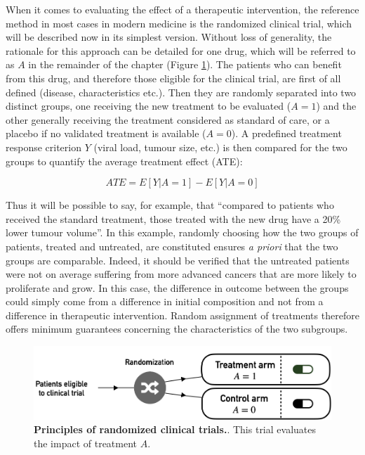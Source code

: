 \documentclass[a4paper,12pt,twoside,onecolumn,openright,final,oldfontcommands]{memoir}
\begin{document}
When it comes to evaluating the effect of a therapeutic intervention,
the reference method in most cases in modern medicine is the randomized
clinical trial, which will be described now in its simplest version.
Without loss of generality, the rationale for this approach can be
detailed for one drug, which will be referred to as \(A\) in the
remainder of the chapter (Figure \ref{fig:trials}). The patients who can
benefit from this drug, and therefore those eligible for the clinical
trial, are first of all defined (disease, characteristics etc.). Then
they are randomly separated into two distinct groups, one receiving the
new treatment to be evaluated (\(A=1\)) and the other generally
receiving the treatment considered as standard of care, or a placebo if
no validated treatment is available (\(A=0\)). A predefined treatment
response criterion \(Y\) (viral load, tumour size, etc.) is then
compared for the two groups to quantify the average treatment effect
(ATE):

\[ATE= E[Y|A=1]-E[Y|A=0]\]

Thus it will be possible to say, for example, that ``compared to
patients who received the standard treatment, those treated with the new
drug have a 20\% lower tumour volume''. In this example, randomly
choosing how the two groups of patients, treated and untreated, are
constituted ensures \emph{a priori} that the two groups are comparable.
Indeed, it should be verified that the untreated patients were not on
average suffering from more advanced cancers that are more likely to
proliferate and grow. In this case, the difference in outcome between
the groups could simply come from a difference in initial composition
and not from a difference in therapeutic intervention. Random assignment
of treatments therefore offers minimum guarantees concerning the
characteristics of the two subgroups.

\begin{figure}

{\centering \includegraphics[width=0.9\linewidth]{fig/trials} 

}

\caption[Principles of randomized clinical]{\textbf{Principles of randomized clinical trials.}.
This trial evaluates the impact of treatment \(A\).}\label{fig:trials}
\end{figure}
\end{document}
